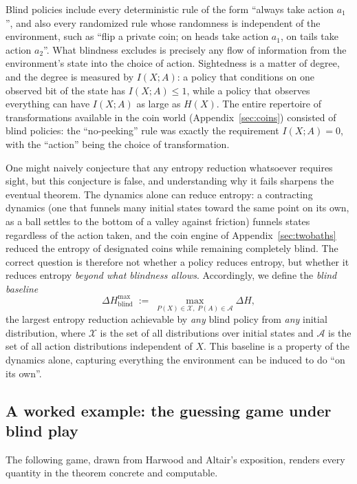 \documentclass[10pt]{article}
\theoremstyle{definition}
\theoremstyle{remark}
\begin{document}
Blind policies include every deterministic rule of the form ``always take action $a_1$'', and also every randomized rule whose randomness is independent of the environment, such as ``flip a private coin; on heads take action $a_1$, on tails take action $a_2$''. What blindness excludes is precisely any flow of information from the environment's state into the choice of action. Sightedness is a matter of degree, and the degree is measured by $I(X;A)$: a policy that conditions on one observed bit of the state has $I(X;A) \le 1$, while a policy that observes everything can have $I(X;A)$ as large as $H(X)$. The entire repertoire of transformations available in the coin world (Appendix~\ref{sec:coins}) consisted of blind policies: the ``no-peeking'' rule was exactly the requirement $I(X;A) = 0$, with the ``action'' being the choice of transformation.

One might naively conjecture that any entropy reduction whatsoever requires sight, but this conjecture is false, and understanding why it fails sharpens the eventual theorem. The dynamics alone can reduce entropy: a contracting dynamics (one that funnels many initial states toward the same point on its own, as a ball settles to the bottom of a valley against friction) funnels states regardless of the action taken, and the coin engine of Appendix~\ref{sec:twobaths} reduced the entropy of designated coins while remaining completely blind. The correct question is therefore not whether a policy reduces entropy, but whether it reduces entropy \emph{beyond what blindness allows}. Accordingly, we define the \emph{blind baseline}
\[
\Delta H^{\max}_{\text{blind}} \;:=\; \max_{P(X) \in \mathcal{X},\; P(A) \in \mathcal{A}} \Delta H,
\]
the largest entropy reduction achievable by \emph{any} blind policy from \emph{any} initial distribution, where $\mathcal{X}$ is the set of all distributions over initial states and $\mathcal{A}$ is the set of all action distributions independent of $X$. This baseline is a property of the dynamics alone, capturing everything the environment can be induced to do ``on its own''.

\subsection{A worked example: the guessing game under blind play}
\label{sec:gameblind}

The following game, drawn from Harwood and Altair's exposition, renders every quantity in the theorem concrete and computable.
\end{document}
